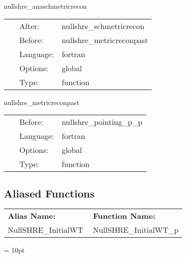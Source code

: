 \hspace{5mm} nullshre\_anaschmetricrecon 

\hspace{5mm}{\it analytic schwarzchild metric and its derivatives on the sphere } 


\hspace{5mm}

 \begin{tabular*}{160mm}{cll} 
~ & After:  & nullshre\_schmetricrecon \\ 
~ & Before:  & nullshre\_metricreconpast \\ 
~ & Language:  & fortran \\ 
~ & Options:  & global \\ 
~ & Type:  & function \\ 
\end{tabular*} 


\vspace{5mm}


\hspace{5mm} nullshre\_metricreconpast 

\hspace{5mm}{\it copy current metric to past levels } 


\hspace{5mm}

 \begin{tabular*}{160mm}{cll} 
~ & Before:  & nullshre\_pointing\_p\_p \\ 
~ & Language:  & fortran \\ 
~ & Options:  & global \\ 
~ & Type:  & function \\ 
\end{tabular*} 


\subsection*{Aliased Functions}

\hspace{5mm}

 \begin{tabular*}{160mm}{ll} 

{\bf Alias Name:} ~~~~~~~ & {\bf Function Name:} \\ 
NullSHRE\_InitialWT & NullSHRE\_InitialWT\_p \\ 
\end{tabular*} 



\vspace{5mm}\parskip = 10pt 
